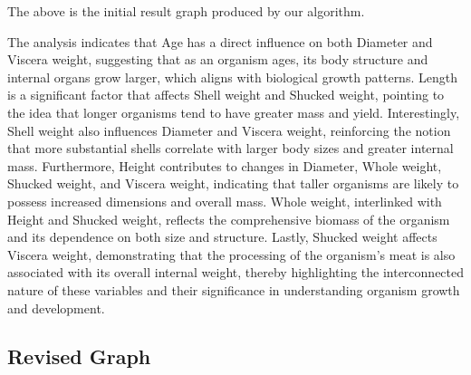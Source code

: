 \documentclass{article}
\begin{document}
The above is the initial result graph produced by our algorithm.

The analysis indicates that Age has a direct influence on both Diameter and Viscera weight, suggesting that as an organism ages, its body structure and internal organs grow larger, which aligns with biological growth patterns. Length is a significant factor that affects Shell weight and Shucked weight, pointing to the idea that longer organisms tend to have greater mass and yield. Interestingly, Shell weight also influences Diameter and Viscera weight, reinforcing the notion that more substantial shells correlate with larger body sizes and greater internal mass. Furthermore, Height contributes to changes in Diameter, Whole weight, Shucked weight, and Viscera weight, indicating that taller organisms are likely to possess increased dimensions and overall mass. Whole weight, interlinked with Height and Shucked weight, reflects the comprehensive biomass of the organism and its dependence on both size and structure. Lastly, Shucked weight affects Viscera weight, demonstrating that the processing of the organism's meat is also associated with its overall internal weight, thereby highlighting the interconnected nature of these variables and their significance in understanding organism growth and development.

\subsection{Revised Graph}
\end{document}

